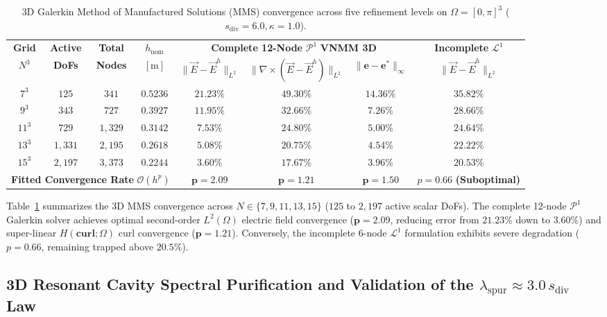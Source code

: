 \documentclass[preprint,12pt]{elsarticle}
\newcommand{\curl}{\nabla \times}
\begin{document}
\begin{table}[htbp]
\centering
\caption{3D Galerkin Method of Manufactured Solutions (MMS) convergence across five refinement levels on $\Omega = [0,\pi]^3$ ($s_{\text{div}} = 6.0, \kappa = 1.0$).}
\label{tab:mms_convergence_3d}
\footnotesize
\begin{tabular}{cccccccc}
\toprule
\textbf{Grid} & \textbf{Active} & \textbf{Total} & $h_{\text{nom}}$ & \multicolumn{3}{c}{\textbf{Complete 12-Node} $\mathcal{P}^1$ \textbf{VNMM 3D}} & \textbf{Incomplete} $\mathcal{L}^1$ \\
\cmidrule(lr){5-7} \cmidrule(lr){8-8}
$N^3$ & \textbf{DoFs} & \textbf{Nodes} & $[\text{m}]$ & $\|\vec{E}-\vec{E}^h\|_{L^2}$ & $\|\curl(\vec{E}-\vec{E}^h)\|_{L^2}$ & $\|\mathbf{e}-\mathbf{e}^*\|_{\infty}$ & $\|\vec{E}-\vec{E}^h\|_{L^2}$ \\
\midrule
$7^3$  & $125$   & $341$   & $0.5236$ & $21.23\%$ & $49.30\%$ & $14.36\%$ & $35.82\%$ \\
$9^3$  & $343$   & $727$   & $0.3927$ & $11.95\%$ & $32.66\%$ & $7.26\%$  & $28.66\%$ \\
$11^3$ & $729$   & $1{,}329$ & $0.3142$ & $7.53\%$  & $24.80\%$ & $5.00\%$  & $24.64\%$ \\
$13^3$ & $1{,}331$ & $2{,}195$ & $0.2618$ & $5.08\%$  & $20.75\%$ & $4.54\%$  & $22.22\%$ \\
$15^3$ & $2{,}197$ & $3{,}373$ & $0.2244$ & $3.60\%$  & $17.67\%$ & $3.96\%$  & $20.53\%$ \\
\midrule
\multicolumn{4}{l}{\textbf{Fitted Convergence Rate} $\mathcal{O}(h^p)$} & $\mathbf{p = 2.09}$ & $\mathbf{p = 1.21}$ & $\mathbf{p = 1.50}$ & $p = 0.66$ \textbf{(Suboptimal)} \\
\bottomrule
\end{tabular}
\end{table}

Table~\ref{tab:mms_convergence_3d} summarizes the 3D MMS convergence across $N \in \{7, 9, 11, 13, 15\}$ ($125$ to $2{,}197$ active scalar DoFs). The complete 12-node $\mathcal{P}^1$ Galerkin solver achieves optimal second-order $L^2(\Omega)$ electric field convergence ($\mathbf{p = 2.09}$, reducing error from $21.23\%$ down to $3.60\%$) and super-linear $H(\mathbf{curl};\Omega)$ curl convergence ($\mathbf{p = 1.21}$). Conversely, the incomplete 6-node $\mathcal{L}^1$ formulation exhibits severe degradation ($p = 0.66$, remaining trapped above $20.5\%$).

\subsection{3D Resonant Cavity Spectral Purification and Validation of the $\lambda_{\text{spur}} \approx 3.0\,s_{\text{div}}$ Law}
\label{subsec:sec5_5_cavity_purification}
\end{document}
